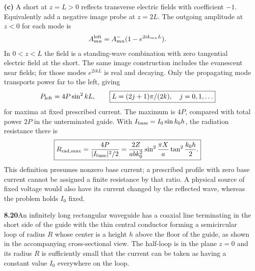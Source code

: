 \medskip\noindent\textbf{(c)} A short at $z=L>0$ reflects transverse electric fields with
coefficient $-1$.  Equivalently add a negative image probe at
$z=2L$.  The outgoing amplitude at $z<0$ for each mode is
\[
A_{mn}^{\rm left}=A_{mn}^{-}(1-e^{2ik_{mn}L}).
\]
In $0<z<L$ the field is a standing-wave combination with zero
tangential electric field at the short.  The same image construction
includes the evanescent near fields; for those modes $e^{2ikL}$
is real and decaying.  Only the propagating mode transports power
far to the left, giving
\[
P_{\rm left}=4P\sin^2kL,\qquad
\boxed{L=(2j+1)\pi/(2k),\quad j=0,1,\ldots}
\]
for maxima at fixed prescribed current.  The maximum is $4P$,
compared with total power $2P$ in the unterminated guide.
With $I_{\rm base}=I_0\sin k_0h$, the radiation resistance there is
\[
\boxed{R_{\rm rad,max}=\frac{4P}{|I_{\rm base}|^2/2}
 =\frac{2Z}{abk_0^2}\sin^2\frac{\pi X}{a}
 \tan^2\frac{k_0h}{2}.}
\]
This definition presumes nonzero base current; a prescribed profile
with zero base current cannot be assigned a finite resistance by
that ratio.  A physical source of fixed voltage would also have
its current changed by the reflected wave, whereas the problem
holds $I_0$ fixed.

\par\bigskip
\noindent\textbf{8.20}\quad An infinitely long rectangular waveguide has a coaxial line terminating in the short side of the guide with the thin central conductor forming a semicircular loop of radius $R$ whose center is a height $h$ above the floor of the guide, as shown in the accompanying cross-sectional view. The half-loop is in the plane $z=0$ and its radius $R$ is sufficiently small that the current can be taken as having a constant value $I_{0}$ everywhere on the loop.

\begin{center}
\end{center}

